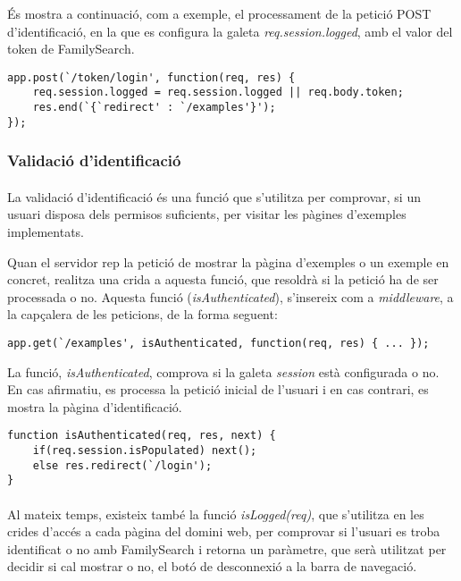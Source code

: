     És mostra a continuació, com a exemple, el processament de la petició POST d'identificació, en la que es configura la galeta \emph{req.session.logged}, amb el valor del token de FamilySearch.

    \begin{lstlisting}[style=rawOwn,caption={Resposta a la petició AJAX d'identificació}]
app.post(`/token/login', function(req, res) {
    req.session.logged = req.session.logged || req.body.token;
    res.end(`{`redirect' : `/examples'}');
});
    \end{lstlisting}


    \subsubsection{Validació d'identificació}

    \paragraph{}
    La validació d'identificació és una funció que s'utilitza per comprovar, si un usuari disposa dels permisos suficients, per visitar les pàgines d'exemples implementats.

    Quan el servidor rep la petició de mostrar la pàgina d'exemples o un exemple en concret, realitza una crida a aquesta funció, que resoldrà si la petició ha de ser processada o no. Aquesta funció (\emph{isAuthenticated}), s'insereix com a \emph{middleware}, a la capçalera de les peticions, de la forma seguent:

    \begin{lstlisting}[style=rawOwn,caption={Inserció de \emph{middleware} en una petició del client}]
app.get(`/examples', isAuthenticated, function(req, res) { ... });
    \end{lstlisting}

    La funció, \emph{isAuthenticated}, comprova si la galeta \emph{session} està configurada o no. En cas afirmatiu, es processa la petició inicial de l'usuari i en cas contrari, es mostra la pàgina d'identificació.

    \begin{lstlisting}[style=rawOwn,caption={Comprovació de la galeta \emph{session}}]
function isAuthenticated(req, res, next) {
    if(req.session.isPopulated) next();
    else res.redirect(`/login');
}
    \end{lstlisting}

    \paragraph{}
    Al mateix temps, existeix també la funció \emph{isLogged(req)}, que s’utilitza en les crides d’accés a cada pàgina del domini web, per comprovar si l’usuari es troba identificat o no amb FamilySearch i retorna un paràmetre, que serà utilitzat per decidir si cal mostrar o no, el botó de desconnexió a la barra de navegació.

